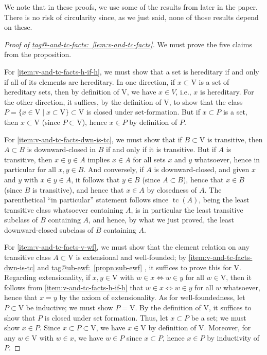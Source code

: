 \documentclass{amsart}
\makeatletter
\newcommand\rV{\mathrm{V}}
\newcommand\set[2][]{#1\{ #2 #1\}}
\newcommand\tc{\operatorname{tc}}
\newcommand\ToT{\Leftrightarrow}
\newcommand\tagword[1]{\csname tag@#1\endcsname}
\def\label@tag#1:#2\@nil{#1}
\newcommand\labeltag[1]{\label@tag#1:\@nil}
\newcommand\jref[1]{%
  \texorpdfstring%
    {\hyperref[#1]{\tagword{\labeltag{#1}}~\ref*{#1}}}%
    {\tagword{\labeltag{#1}}~\ref*{#1}}%
}
\theoremstyle{definition}
\theoremstyle{remark}
\theoremstyle{plainwithref}
\newenvironment{settybox}{\begin{tcolorbox}[colback=blue!20,breakable%
    ,enhanced%
    ,sharp corners%
    ,frame hidden%
    ,boxsep=0pt
    ,left=5pt,right=5pt,top=5pt,bottom=5pt
    ,enlarge left by=-5pt,width=\linewidth+10pt
    ,enlarge top by=5pt,enlarge bottom by=5pt
    ,before skip balanced=0pt,after skip balanced=0pt
    ]}{\end{tcolorbox}}
\makeatother
\begin{document}
We note that in these proofs, we use some of the results from later in the paper.
There is no risk of circularity since, as we just said, none of those results depend on these.

\begin{settybox}
  \begin{proof}[Proof of \jref{lem:v-and-tc-facts}] \label{proof:v-and-tc-facts}
    We must prove the five claims from the proposition.

    For \ref{item:v-and-tc-facts-h-if-h}, we must show that a set is hereditary if and only if all of its elements are hereditary.
    In one direction, if \( x \subset \rV \) is a set of hereditary sets, then by definition of \( \rV \), we have \( x \in V \), i.e., \( x \) is hereditary.
    For the other direction, it suffices, by the definition of \( \rV \), to show that the class \( P = \set{ x \in \rV \mid x \subset \rV } \subset \rV \) is closed under set-formation.
    But if \( x \subset P \) is a set, then \( x \subset \rV \) (since \( P \subset \rV \)), hence \( x \in P \) by definition of \( P \).

    For \ref{item:v-and-tc-facts-dwn-is-tc}, we must show that if \( B \subset \rV \) is transitive, then \( A \subset B \) is downward-closed in \( B \) if and only if it is transitive.
    But if \( A \) is transitive, then \( x \in y \in A \) implies \( x \in A \) for all sets \( x \) and \( y \) whatsoever, hence in particular for all \( x,y \in B \).
    And conversely, if \( A \) is downward-closed, and given \( x \) and \( y \) with \( x \in y \in A \), it follows that \( y \in B \) (since \( A \subset B \)), hence that \( x \in B \) (since \( B \) is transitive), and hence that \( x \in A \) by closedness of \( A \).
    The parenthetical ``in particular'' statement follows since \( \tc(A) \), being the least transitive class whatsoever containing \( A \), is in particular the least transitive subclass of \( B \) containing \( A \), and hence, by what we just proved, the least downward-closed subclass of \( B \) containing \( A \).

    For \ref{item:v-and-tc-facts-v-wf}, we must show that the element relation on any transitive class \( A \subset \rV \) is extensional and well-founded; by \ref{item:v-and-tc-facts-dwn-is-tc} and \jref{propn:sub-ewf}, it suffices to prove this for \( \rV \).
    Regarding extensionality, if \( x,y \in \rV \) with \( w \in x \ToT w \in y \) for all \( w \in \rV \), then it follows from \ref{item:v-and-tc-facts-h-if-h} that \( w \in x \ToT w \in y \) for all \( w \) whatsoever, hence that \( x = y \) by the axiom of extensionality.
    As for well-foundedness, let \( P \subset \rV \) be inductive; we must show \( P = \rV \).
    By the definition of \( \rV \), it suffices to show that \( P \) is closed under set formation.
    Thus, let \( x \subset P \) be a set; we must show \( x \in P \).
    Since \( x \subset P \subset \rV \), we have \( x \in \rV \) by definition of \( \rV \).
    Moreover, for any \( w \in \rV \) with \( w \in x \), we have \( w \in P \) since \( x \subset P \), hence \( x \in P \) by inductivity of \( P \).


\end{proof}
\end{settybox}
\end{document}
